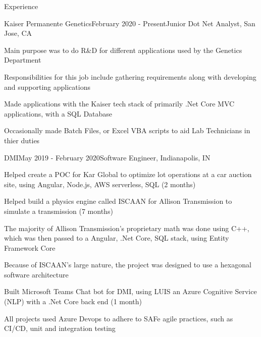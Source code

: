 \documentclass{resume} %
\begin{document}
\begin{rSection}{Experience}
\begin{rSubsection}{Kaiser Permanente Genetics}{February 2020 - Present}{Junior Dot Net Analyst, San Jose, CA}

\item Main purpose was to do R&D for different applications used by the Genetics Department
\item Responsibilities for this job include gathering requirements along with developing and supporting applications
\item Made applications with the Kaiser tech stack of primarily .Net Core MVC applications, with a SQL Database
\item Occasionally made Batch Files, or Excel VBA scripts to aid Lab Technicians in thier duties
\end{rSubsection}
\begin{rSubsection}{DMI}{May 2019 - February 2020}{Software Engineer, Indianapolis, IN}

\item Helped create a POC for Kar Global to optimize lot operations at a car auction site, using Angular, Node.js, AWS serverless, SQL (2 months)
\item Helped build a physics engine called ISCAAN for Allison Transmission to simulate a transmission (7 months)
\item The majority of Allison Transmission's proprietary math was done using C++, which was then passed to a Angular, .Net Core, SQL stack, using Entity Framework Core 
\item Because of ISCAAN's large nature, the project was designed to use a hexagonal software architecture
\item Built Microsoft Teams Chat bot for DMI, using LUIS an Azure Cognitive Service (NLP) with a .Net Core back end (1 month)
\item All projects used Azure Devops to adhere to SAFe agile practices, such as CI/CD, unit and integration testing
\end{rSubsection}

\end{rSection}

\end{document}

